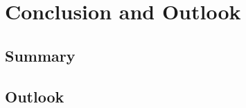 \chapter{Conclusion and Outlook}
\label{ch:conclusion}

\section{Summary}
\label{sec:summary}

\section{Outlook}
\label{sec:outlook}
